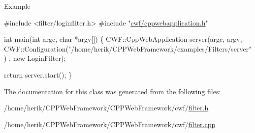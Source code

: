 \begin{DoxyParagraph}{Example}
\begin{DoxyCode}
\textcolor{preprocessor}{#include <filter/loginfilter.h>}
\textcolor{preprocessor}{#include "\hyperlink{cppwebapplication_8h}{cwf/cppwebapplication.h}"}

\textcolor{keywordtype}{int} main(\textcolor{keywordtype}{int} argc, \textcolor{keywordtype}{char} *argv[])
\{
    CWF::CppWebApplication server(argc,
                                  argv,
                                  CWF::Configuration(\textcolor{stringliteral}{"/home/herik/CPPWebFramework/examples/Filters/server"})
      ,
                                  \textcolor{keyword}{new} LoginFilter);

    \textcolor{keywordflow}{return} server.start();
\}
\end{DoxyCode}
 
\end{DoxyParagraph}


The documentation for this class was generated from the following files\+:\begin{DoxyCompactItemize}
\item 
/home/herik/\+C\+P\+P\+Web\+Framework/\+C\+P\+P\+Web\+Framework/cwf/\hyperlink{filter_8h}{filter.\+h}\item 
/home/herik/\+C\+P\+P\+Web\+Framework/\+C\+P\+P\+Web\+Framework/cwf/\hyperlink{filter_8cpp}{filter.\+cpp}\end{DoxyCompactItemize}
